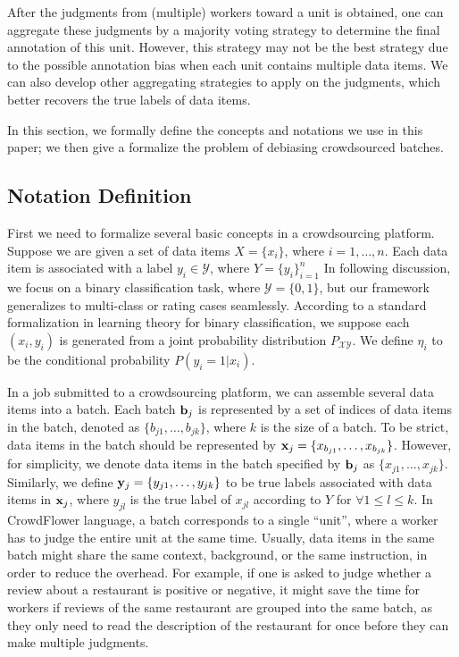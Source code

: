 {After the judgments from (multiple) workers toward a unit is obtained,
one can aggregate these judgments by a majority voting strategy to determine the final annotation of this unit.
However, this strategy may not be the best strategy due to the possible annotation bias when each unit contains multiple data items.
We can also develop other aggregating strategies to apply on the judgments,
which better recovers the true labels of data items.
}

%

In this section, we formally define the concepts and notations we use in this paper;
we then give a formalize the problem of debiasing crowdsourced batches.


\subsection{Notation Definition}

First we need to formalize several basic concepts in a crowdsourcing platform.
Suppose we are given a set of data items $X = \{x_i\}$, where $i=1, \ldots, n$.
Each data item is associated with a label $y_i \in \mathcal{Y}$, where $Y = \{y_i\}_{i=1}^n$
In following discussion, we focus on a binary classification task, 
where $\mathcal{Y} = \{0, 1\}$, 
but our framework generalizes to multi-class or rating cases seamlessly.  
According to a standard formalization in learning theory for binary classification, 
we suppose each $(x_i, y_i)$ is generated from a joint probability distribution $P_{\mathcal{X} \mathcal{Y}}$.
We define $\eta_i$ to be the conditional probability $P(y_i = 1 | x_i)$. 

In a job submitted to a crowdsourcing platform,
we can assemble several data items into a batch. %
Each batch ${\mathbf{b}}_j$ is represented by a set of indices of data items in the batch,
denoted as $\{b_{j1}, \ldots, b_{jk}\}$, 
where $k$ is the size of a batch. 
To be strict, data items in the batch should be represented by ${\mathbf{x}}_j = \{x_{b_{j1}}, \ldots, x_{b_{jk}}\}$.  
However, for simplicity, we denote data items in the batch specified by ${\mathbf{b}}_j$ as $\{x_{j1}, \ldots, x_{jk}\}$.  
Similarly, we define ${\mathbf{y}}_j = \{y_{j1}, \ldots, y_{jk}\}$ to be true labels associated with data items in ${\mathbf{x}}_j$, 
where $y_{jl}$ is the true label of $x_{jl}$ according to $Y$ for $\forall 1 \leq l \leq k$.  
In CrowdFlower language, 
a batch corresponds to a single ``unit'', 
where a worker has to judge the entire unit at the same time.
Usually, data items in the same batch might share the same context, background, or the same instruction, 
in order to reduce the overhead.  
For example, if one is asked to judge whether a review about a restaurant is positive or negative, 
it might save the time for workers if reviews of the same restaurant are grouped into the same batch, 
as they only need to read the description of the restaurant for once before they can make multiple judgments.  

